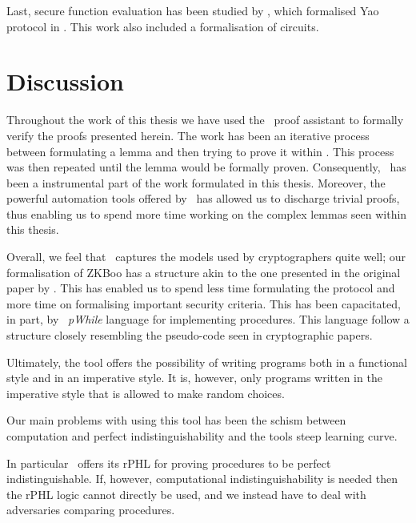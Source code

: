 Last, secure function evaluation has been studied by \citet{Yao}, which
formalised Yao protocol in \easycrypt. This work also included a formalisation
of circuits.


\section{Discussion}
\label{sec:discussion}
Throughout the work of this thesis we have used the \easycrypt\ proof assistant
to formally verify the proofs presented herein.
The work has been an iterative process between formulating a lemma and then
trying to prove it within \easycrypt. This process was then repeated until the
lemma would be formally proven. Consequently, \easycrypt\ has been a
instrumental part of the work formulated in this thesis. Moreover, the powerful
automation tools offered by \easycrypt\ has allowed us to discharge trivial
proofs, thus enabling us to spend more time working on the complex lemmas seen
within this thesis.

Overall, we feel that \easycrypt\ captures the models used by cryptographers
quite well; our formalisation of ZKBoo has a structure akin to the one presented
in the original paper by \citet{zkboo}. This has enabled us to spend less time
formulating the protocol and more time on formalising important security criteria.
This has been capacitated, in part, by \easycrypt\ \textit{pWhile} language for
implementing procedures. This language follow a structure closely resembling the
pseudo-code seen in cryptographic papers.

Ultimately, the tool offers the possibility of writing programs both in a
functional style and in an imperative style. It is, however, only programs
written in the imperative style that is allowed to make random choices.

Our main problems with using this tool has been the schism between computation
and perfect indistinguishability and the tools steep learning curve.

In particular \easycrypt\ offers its rPHL for proving procedures to be perfect
indistinguishable. If, however, computational indistinguishability is needed then
the rPHL logic cannot directly be used, and we instead have to deal with
adversaries comparing procedures.

